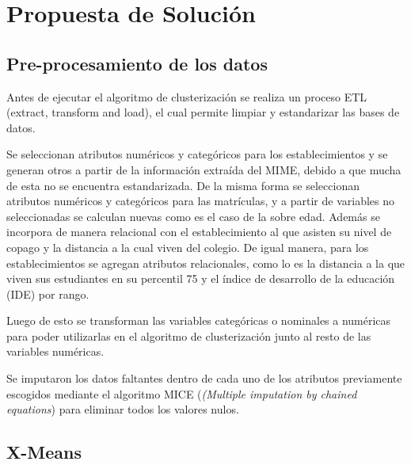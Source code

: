 \chapter{Propuesta de Solución}

\section{Pre-procesamiento de los datos}

Antes de ejecutar el algoritmo de clusterización se realiza un proceso ETL (extract, transform and load), el cual permite limpiar y estandarizar las bases de datos.

Se seleccionan atributos numéricos y categóricos para los establecimientos y se generan otros a partir de la información extraída del MIME, debido a que mucha de esta no se encuentra estandarizada. De la misma forma se seleccionan atributos numéricos y categóricos para las matrículas, y a partir de variables no seleccionadas se calculan nuevas como es el caso de la sobre edad. Además se incorpora de manera relacional con el establecimiento al que asisten su nivel de copago y la distancia a la cual viven del colegio. De igual manera, para los establecimientos se agregan atributos relacionales, como lo es la distancia a la que viven sus estudiantes en su percentil 75 y el índice de desarrollo de la educación (IDE) por rango.

Luego de esto se transforman las variables categóricas o nominales a numéricas para poder utilizarlas en el algoritmo de clusterización junto al resto de las variables numéricas.

Se imputaron los datos faltantes dentro de cada uno de los atributos previamente escogidos mediante el algoritmo MICE (\textit{(Multiple imputation by chained equations}) para eliminar todos los valores nulos.

\section{X-Means}

